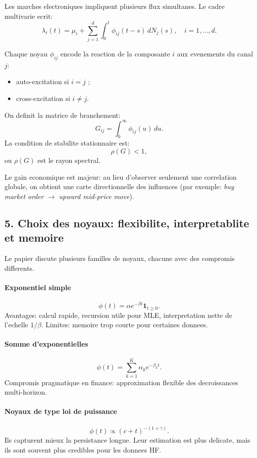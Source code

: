 \documentclass[11pt,a4paper]{article}
\begin{document}
Les marches electroniques impliquent plusieurs flux simultanes. Le cadre multivarie ecrit:
\begin{equation}
\lambda_i(t)=\mu_i+\sum_{j=1}^{d}\int_0^t \phi_{ij}(t-s)\,dN_j(s),\quad i=1,\dots,d.
\label{eq:hawkes_multi}
\end{equation}

Chaque noyau $\phi_{ij}$ encode la reaction de la composante $i$ aux evenements du canal $j$:
\begin{itemize}[leftmargin=1.2cm]
    \item auto-excitation si $i=j$ ;
    \item cross-excitation si $i\neq j$.
\end{itemize}

On definit la matrice de branchement:
\[
G_{ij}=\int_0^\infty \phi_{ij}(u)\,du.
\]
La condition de stabilite stationnaire est:
\[
\rho(G)<1,
\]
ou $\rho(G)$ est le rayon spectral.

Le gain economique est majeur: au lieu d'observer seulement une correlation globale, on obtient une carte directionnelle des influences (par exemple: \emph{buy market order} $\rightarrow$ \emph{upward mid-price move}).

\subsection*{5. Choix des noyaux: flexibilite, interpretablite et memoire}

Le papier discute plusieurs familles de noyaux, chacune avec des compromis differents.

\paragraph{Exponentiel simple}
\[
\phi(t)=\alpha e^{-\beta t}\mathbf{1}_{t\ge 0}.
\]
Avantages: calcul rapide, recursion utile pour MLE, interpretation nette de l'echelle $1/\beta$. Limites: memoire trop courte pour certaines donnees.

\paragraph{Somme d'exponentielles}
\[
\phi(t)=\sum_{k=1}^{K}\alpha_k e^{-\beta_k t}.
\]
Compromis pragmatique en finance: approximation flexible des decroissances multi-horizon.

\paragraph{Noyaux de type loi de puissance}
\[
\phi(t)\propto (c+t)^{-(1+\gamma)}.
\]
Ils capturent mieux la persistance longue. Leur estimation est plus delicate, mais ils sont souvent plus credibles pour les donnees HF.
\end{document}
